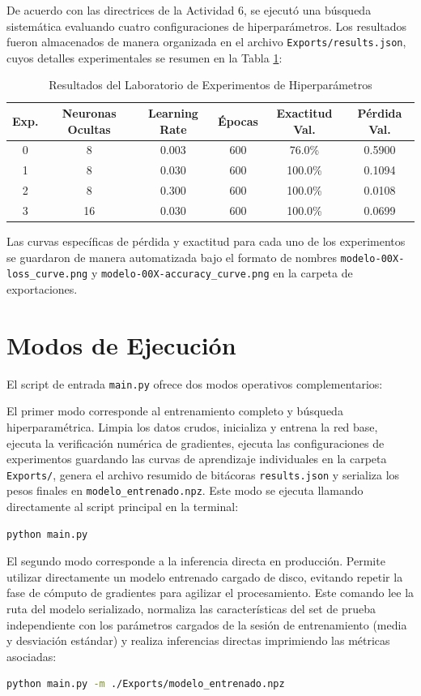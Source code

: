 \documentclass[11pt,a4paper]{article}
\begin{document}
De acuerdo con las directrices de la Actividad 6, se ejecutó una búsqueda sistemática evaluando cuatro configuraciones de hiperparámetros. Los resultados fueron almacenados de manera organizada en el archivo \texttt{Exports/results.json}, cuyos detalles experimentales se resumen en la Tabla \ref{tab:experimentos}:

\begin{table}[h]
\centering
\caption{Resultados del Laboratorio de Experimentos de Hiperparámetros}
\label{tab:experimentos}
\begin{tabular}{cccccc}
\toprule
\textbf{Exp.} & \textbf{Neuronas Ocultas} & \textbf{Learning Rate} & \textbf{Épocas} & \textbf{Exactitud Val.} & \textbf{Pérdida Val.} \\
\midrule
0 & 8 & 0.003 & 600 & 76.0\% & 0.5900 \\
1 & 8 & 0.030 & 600 & 100.0\% & 0.1094 \\
2 & 8 & 0.300 & 600 & 100.0\% & 0.0108 \\
3 & 16 & 0.030 & 600 & 100.0\% & 0.0699 \\
\bottomrule
\end{tabular}
\end{table}

Las curvas específicas de pérdida y exactitud para cada uno de los experimentos se guardaron de manera automatizada bajo el formato de nombres \texttt{modelo-00X-loss\_curve.png} y \texttt{modelo-00X-accuracy\_curve.png} en la carpeta de exportaciones.

\section*{Modos de Ejecución}
El script de entrada \texttt{main.py} ofrece dos modos operativos complementarios:

El primer modo corresponde al entrenamiento completo y búsqueda hiperparamétrica. Limpia los datos crudos, inicializa y entrena la red base, ejecuta la verificación numérica de gradientes, ejecuta las configuraciones de experimentos guardando las curvas de aprendizaje individuales en la carpeta \texttt{Exports/}, genera el archivo resumido de bitácoras \texttt{results.json} y serializa los pesos finales en \texttt{modelo\_entrenado.npz}. Este modo se ejecuta llamando directamente al script principal en la terminal:
\begin{lstlisting}[language=bash]
python main.py
\end{lstlisting}

El segundo modo corresponde a la inferencia directa en producción. Permite utilizar directamente un modelo entrenado cargado de disco, evitando repetir la fase de cómputo de gradientes para agilizar el procesamiento. Este comando lee la ruta del modelo serializado, normaliza las características del set de prueba independiente con los parámetros cargados de la sesión de entrenamiento (media y desviación estándar) y realiza inferencias directas imprimiendo las métricas asociadas:
\begin{lstlisting}[language=bash]
python main.py -m ./Exports/modelo_entrenado.npz
\end{lstlisting}
\end{document}
